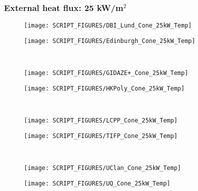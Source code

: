 \subsubsection{External heat flux: 25 kW/m$^2$}
\begin{minipage}{0.5\textwidth}
\begin{figure}[H]
{\texttt{[image: SCRIPT\_FIGURES/DBI\_Lund\_Cone\_25kW\_Temp]}}\\
\end{figure}
\end{minipage}
\begin{minipage}{0.35\textwidth}
\begin{figure}[H]
{\texttt{[image: SCRIPT\_FIGURES/Edinburgh\_Cone\_25kW\_Temp]}}\\
\end{figure}
\end{minipage}\\
\begin{minipage}{0.5\textwidth}
\begin{figure}[H]
{\texttt{[image: SCRIPT\_FIGURES/GIDAZE+\_Cone\_25kW\_Temp]}}\\
\end{figure}
\end{minipage}
\begin{minipage}{0.35\textwidth}
\begin{figure}[H]
{\texttt{[image: SCRIPT\_FIGURES/HKPoly\_Cone\_25kW\_Temp]}}\\
\end{figure}
\end{minipage}\\
\begin{minipage}{0.5\textwidth}
\begin{figure}[H]
{\texttt{[image: SCRIPT\_FIGURES/LCPP\_Cone\_25kW\_Temp]}}\\
\end{figure}
\end{minipage}
\begin{minipage}{0.35\textwidth}
\begin{figure}[H]
{\texttt{[image: SCRIPT\_FIGURES/TIFP\_Cone\_25kW\_Temp]}}\\
\end{figure}
\end{minipage}\\
\vfill
\newpage
\noindent
\begin{minipage}{0.5\textwidth}
\begin{figure}[H]
{\texttt{[image: SCRIPT\_FIGURES/UClan\_Cone\_25kW\_Temp]}}\\
\end{figure}
\end{minipage}
\begin{minipage}{0.35\textwidth}
\begin{figure}[H]
{\texttt{[image: SCRIPT\_FIGURES/UQ\_Cone\_25kW\_Temp]}}\\
\end{figure}
\end{minipage}

